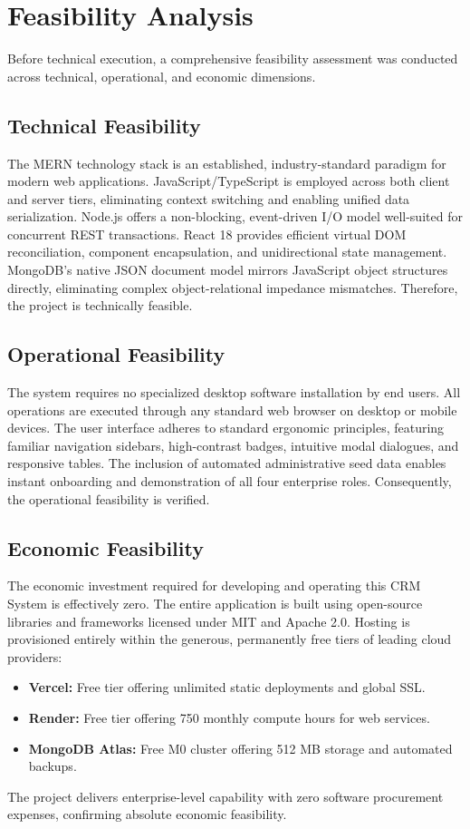 \section{Feasibility Analysis}
Before technical execution, a comprehensive feasibility assessment was conducted across technical, operational, and economic dimensions.

\subsection{Technical Feasibility}
The MERN technology stack is an established, industry-standard paradigm for modern web applications. JavaScript/TypeScript is employed across both client and server tiers, eliminating context switching and enabling unified data serialization. Node.js offers a non-blocking, event-driven I/O model well-suited for concurrent REST transactions. React 18 provides efficient virtual DOM reconciliation, component encapsulation, and unidirectional state management. MongoDB's native JSON document model mirrors JavaScript object structures directly, eliminating complex object-relational impedance mismatches. Therefore, the project is technically feasible.

\subsection{Operational Feasibility}
The system requires no specialized desktop software installation by end users. All operations are executed through any standard web browser on desktop or mobile devices. The user interface adheres to standard ergonomic principles, featuring familiar navigation sidebars, high-contrast badges, intuitive modal dialogues, and responsive tables. The inclusion of automated administrative seed data enables instant onboarding and demonstration of all four enterprise roles. Consequently, the operational feasibility is verified.

\subsection{Economic Feasibility}
The economic investment required for developing and operating this CRM System is effectively zero. The entire application is built using open-source libraries and frameworks licensed under MIT and Apache 2.0. Hosting is provisioned entirely within the generous, permanently free tiers of leading cloud providers:
\begin{itemize}
    \item \textbf{Vercel:} Free tier offering unlimited static deployments and global SSL.
    \item \textbf{Render:} Free tier offering 750 monthly compute hours for web services.
    \item \textbf{MongoDB Atlas:} Free M0 cluster offering 512 MB storage and automated backups.
\end{itemize}
The project delivers enterprise-level capability with zero software procurement expenses, confirming absolute economic feasibility.

